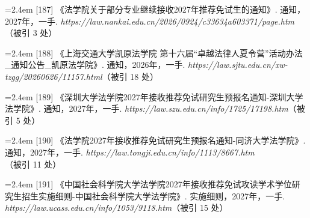 {\vspace{3.5pt}\par
\nopagebreak\vspace{1pt}
\noindent\hangindent=2.4em \label{src:S0239}{\color{cAccent}[187]} 《法学院关于部分专业继续接收2027年推荐免试生的通知》. 通知，2027年，一手. \textit{https://law.nankai.edu.cn/2026/0924/c33634a603371/page.htm}（被引 3 处）\par
\vspace{0.6pt}
\vspace{3.5pt}\par
\nopagebreak\vspace{1pt}
\noindent\hangindent=2.4em \label{src:S0240}{\color{cAccent}[188]} 《上海交通大学凯原法学院 第十六届“卓越法律人夏令营”活动办法\_通知公告\_凯原法学院》. 通知，2026年，一手. \textit{https://law.sjtu.edu.cn/xw-tzgg/20260626/11157.html}（被引 18 处）\par
\vspace{0.6pt}
\vspace{3.5pt}\par
\nopagebreak\vspace{1pt}
\noindent\hangindent=2.4em \label{src:S0241}{\color{cAccent}[189]} 《深圳大学法学院2027年接收推荐免试研究生预报名通知-深圳大学法学院》. 通知，2027年，一手. \textit{https://law.szu.edu.cn/info/1725/17198.htm}（被引 5 处）\par
\vspace{0.6pt}
\vspace{3.5pt}\par
\nopagebreak\vspace{1pt}
\noindent\hangindent=2.4em \label{src:S0242}{\color{cAccent}[190]} 《法学院2027年接收推荐免试研究生预报名通知-同济大学法学院》. 通知，2027年，一手. \textit{https://law.tongji.edu.cn/info/1113/8667.htm}（被引 11 处）\par
\vspace{0.6pt}
\vspace{3.5pt}\par
\nopagebreak\vspace{1pt}
\noindent\hangindent=2.4em \label{src:S0243}{\color{cAccent}[191]} 《中国社会科学院大学法学院2027年接收推荐免试攻读学术学位研究生招生实施细则-中国社会科学院大学法学院》. 实施细则，2027年，一手. \textit{https://law.ucass.edu.cn/info/1053/9118.htm}（被引 15 处）\par
}
